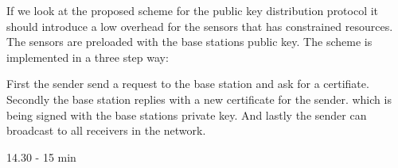 \tiny

If we look at the proposed scheme for the public key distribution protocol it should introduce a low overhead for the sensors that has constrained resources. The sensors are preloaded with the base stations public key. The scheme is implemented in a three step way:

First the sender send a request  to the base station and ask for a certifiate. Secondly the base station replies with a new certificate for the sender. which is being signed with the base stations private key. And lastly the sender can broadcast to all receivers in the network.

\Large{14.30 - 15 min}
